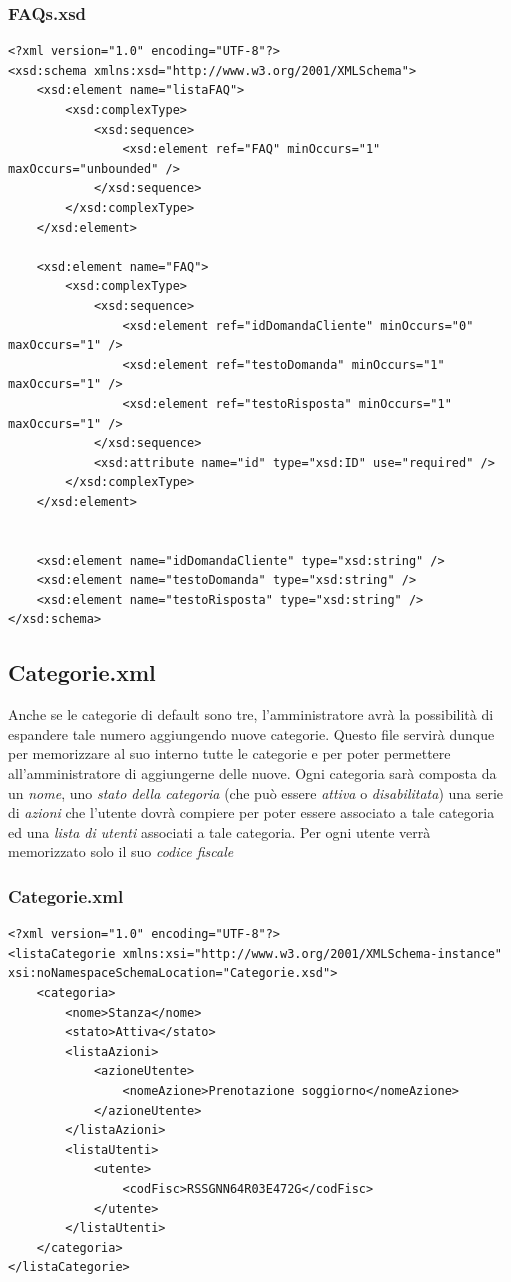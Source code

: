 \documentclass [a4paper, 12pt]{book}
\begin{document}
\subsubsection{FAQs.xsd}
\begin{lstlisting}[style=XML]
<?xml version="1.0" encoding="UTF-8"?>
<xsd:schema xmlns:xsd="http://www.w3.org/2001/XMLSchema">
    <xsd:element name="listaFAQ">
        <xsd:complexType>
            <xsd:sequence>
                <xsd:element ref="FAQ" minOccurs="1" maxOccurs="unbounded" />
            </xsd:sequence>
        </xsd:complexType>
    </xsd:element>

    <xsd:element name="FAQ">
        <xsd:complexType>
            <xsd:sequence>
                <xsd:element ref="idDomandaCliente" minOccurs="0" maxOccurs="1" />
                <xsd:element ref="testoDomanda" minOccurs="1" maxOccurs="1" />
                <xsd:element ref="testoRisposta" minOccurs="1" maxOccurs="1" />
            </xsd:sequence>
            <xsd:attribute name="id" type="xsd:ID" use="required" />
        </xsd:complexType>
    </xsd:element>


    <xsd:element name="idDomandaCliente" type="xsd:string" />
    <xsd:element name="testoDomanda" type="xsd:string" />
    <xsd:element name="testoRisposta" type="xsd:string" />
</xsd:schema>
\end{lstlisting}

\subsection{Categorie.xml}
Anche se le categorie di default sono tre, l'amministratore avrà la possibilità di espandere tale numero aggiungendo nuove categorie. Questo file servirà dunque per memorizzare al suo interno tutte le categorie e per poter permettere all'amministratore di aggiungerne delle nuove. Ogni categoria sarà composta da un \textit{nome}, uno \textit{stato della categoria} (che può essere \textit{attiva} o \textit{disabilitata}) una serie di \textit{azioni} che l'utente dovrà compiere per poter essere associato a  tale categoria ed una \textit{lista di utenti} associati a tale categoria. Per ogni utente verrà memorizzato solo il suo \textit{codice fiscale}

\subsubsection{Categorie.xml}
\begin{lstlisting}[style=XML]
<?xml version="1.0" encoding="UTF-8"?>
<listaCategorie xmlns:xsi="http://www.w3.org/2001/XMLSchema-instance" xsi:noNamespaceSchemaLocation="Categorie.xsd">
    <categoria>
        <nome>Stanza</nome>
        <stato>Attiva</stato>
        <listaAzioni>
            <azioneUtente>
                <nomeAzione>Prenotazione soggiorno</nomeAzione>
            </azioneUtente>
        </listaAzioni>        
        <listaUtenti>
            <utente>
                <codFisc>RSSGNN64R03E472G</codFisc>
            </utente>
        </listaUtenti>
    </categoria>
</listaCategorie>
\end{lstlisting}
\end{document}
